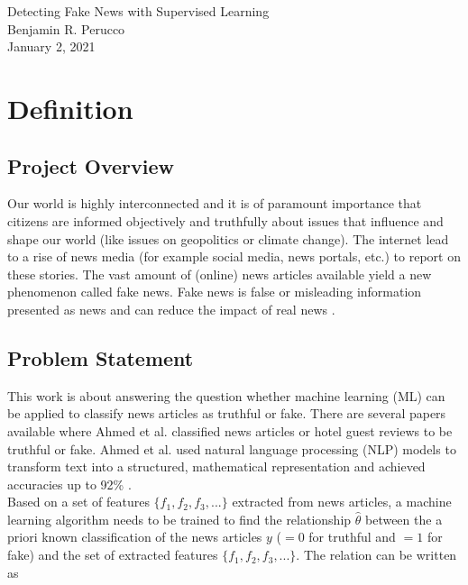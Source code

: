 \documentclass[a4paper,12pt,nottoc]{article}
\begin{document}
\begin{center}{\LARGE Detecting Fake News with Supervised Learning}\\\vspace{.5cm}Benjamin R. Perucco\\\vspace{.25cm}January 2, 2021\end{center}

\section{Definition}

\subsection{Project Overview}

Our world is highly interconnected and it is of paramount importance that citizens are informed objectively and truthfully about issues that influence and shape our world (like issues on geopolitics or climate change). The internet lead to a rise of news media (for example social media, news portals, etc.) to report on these stories. The vast amount of (online) news articles available yield a new phenomenon called fake news. Fake news is false or misleading information presented as news and can reduce the impact of real news \cite{bib:fakenews}. 

\subsection{Problem Statement}

This work is about answering the question whether machine learning (ML) can be applied to classify news articles as truthful or fake. There are several papers available where Ahmed et al. classified news articles \cite{bib:ahmed-2017} or hotel guest reviews \cite{bib:ahmed-2018} to be truthful or fake. Ahmed et al. used natural language processing (NLP) models to transform text into a structured, mathematical representation and achieved accuracies up to 92\% \cite{bib:ahmed-2017}.\\

\noindent Based on a set of features $\{f_{1}, f_{2}, f_{3}, ... \}$ extracted from news articles, a machine learning algorithm needs to be trained to find the relationship $\hat{\theta}$ between the a priori known classification of the news articles $y$ ($=0$ for truthful and $=1$ for fake) and the set of extracted features $\{f_{1}, f_{2}, f_{3}, ... \}$. The relation can be written as
\end{document}
